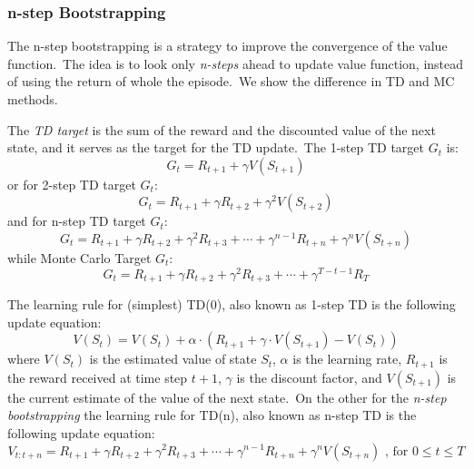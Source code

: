 \documentclass[../xlapes02]{subfiles}
\begin{document}
    \subsubsection{n-step Bootstrapping}\label{subsubsec:n-step-bootstrapping}
    The n-step bootstrapping is a strategy to improve the convergence of the value function.\ The idea is to look only \emph{n-steps} ahead to update value function, instead of using the return of whole the episode.\ We show the difference in TD and MC methods.

    The \emph{TD target} is the sum of the reward and the discounted value of the next state, and it serves as the target for the TD update.\ The 1-step TD target $G_t$ is:
    \begin{equation}
        \label{eq:1-step-td-target}
        G_t=R_{t+1}+\gamma V(S_{t+1})
    \end{equation}
    or for 2-step TD target $G_t$:
    \begin{equation}
        \label{eq:2-step-td-target}
        G_t=R_{t+1}+\gamma R_{t+2}+\gamma^2 V(S_{t+2})
    \end{equation}
    and for n-step TD target $G_t$:
    \begin{equation}
        \label{eq:n-step-td-target}
        G_t=R_{t+1}+\gamma R_{t+2}+\gamma^2 R_{t+3}+\cdots+\gamma^{n-1}R_{t+n}+\gamma^n V(S_{t+n})
    \end{equation}
    while Monte Carlo Target $G_t$:
    \begin{equation}
        \label{eq:mc-target}
        G_t=R_{t+1}+\gamma R_{t+2}+\gamma^2 R_{t+3}+\cdots+\gamma^{T-t-1}R_{T}
    \end{equation}

    The learning rule for (simplest) TD(0), also known as 1-step TD is the following update equation:
    \begin{equation}
        \label{eq:td-update}
        V(S_t)=V(S_t)+\alpha\cdot(R_{t+1}+\gamma\cdot V(S_{t+1})-V(S_t))
    \end{equation}
    where $ V(S_t) $ is the estimated value of state $ S_t $, $ \alpha $ is the learning rate, $ R_{t+1} $ is the reward received at time step $ t+1 $, $ \gamma $ is the discount factor, and $ V(S_{t+1}) $ is the current estimate of the value of the next state.\ On the other for the \emph{n-step bootstrapping} the learning rule for TD(n), also known as n-step TD is the following update equation:
    \begin{equation}
        \label{eq:n-step-td-update}
        V_{t:t+n}=R_{t+1}+\gamma R_{t+2}+\gamma^2 R_{t+3}+\cdots+\gamma^{n-1}R_{t+n}+\gamma^n V(S_{t+n})\text{ , for }0\leq t\leq T
    \end{equation}
\end{document}
